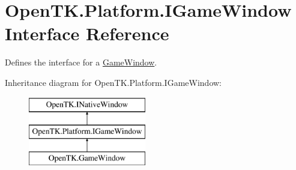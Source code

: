\hypertarget{interface_open_t_k_1_1_platform_1_1_i_game_window}{\section{Open\-T\-K.\-Platform.\-I\-Game\-Window Interface Reference}
\label{interface_open_t_k_1_1_platform_1_1_i_game_window}
}


Defines the interface for a \hyperlink{class_open_t_k_1_1_game_window}{Game\-Window}.  


Inheritance diagram for Open\-T\-K.\-Platform.\-I\-Game\-Window\-:\begin{figure}[H]
\begin{center}
\leavevmode
\includegraphics[height=3.000000cm]{interface_open_t_k_1_1_platform_1_1_i_game_window}
\end{center}
\end{figure}
